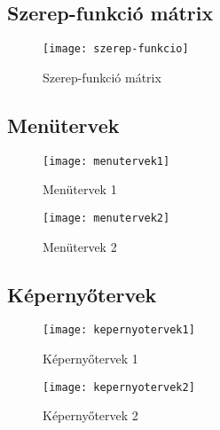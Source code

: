 \pagebreak
\subsection{Szerep-funkció mátrix}

\begin{figure}[!htb]

    \centering
    \texttt{[image: szerep-funkcio]}
    \caption{\label{fig:szerep-funkcio}Szerep-funkció mátrix}

\end{figure}


\subsection{Menütervek}

\begin{figure}[!htb]

    \centering
    \texttt{[image: menutervek1]}
    \caption{\label{fig:menutervek1}Menütervek 1}

\end{figure}

\begin{figure}[!htb]

    \centering
    \texttt{[image: menutervek2]}
    \caption{\label{fig:menutervek2}Menütervek 2}

\end{figure}

\pagebreak
\subsection{Képernyőtervek}

\begin{figure}[!htb]

    \centering
    \texttt{[image: kepernyotervek1]}
    \caption{\label{fig:kepernyotervek1}Képernyőtervek 1}

\end{figure}

\begin{figure}[!htb]

    \centering
    \texttt{[image: kepernyotervek2]}
    \caption{\label{fig:kepernyotervek21}Képernyőtervek 2}

\end{figure}